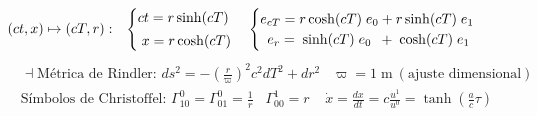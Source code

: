 \begin{align*}
&(ct, x)\mapsto(cT, r):
&\begin{cases} 
ct=r\sinh (cT) \vspace{2pt} \\
\; x=r\cosh(cT) 
\end{cases}
&\begin{cases} 
e_{cT} = r\cosh(cT)\;e_0 + r\sinh(cT)\;e_1\\
\;\:e_r=\; \sinh(cT)\;e_0 \;\:+ \; \cosh(cT) \; e_1
\end{cases}
\end{align*}
\begin{align*}
    &\dashv\text{Métrica de Rindler: } ds^2 = -\left(\frac{r}{\varpi}\right)^2 c^2 dT^2 + dr^2  \;\;\; \varpi= 1 \;\text{m}\: (\text{ajuste dimensional})\\ 
    &\text{Símbolos de Christoffel: } \Gamma^0_{10}=\Gamma^0_{01}= \frac{1}{r}\; \; \; \Gamma^1_{00}  = r\;\; \;\;  \dot{x}= \frac{dx}{dt}=c\frac{u^1}{u^0}=\tanh(\tfrac{a}{c}\tau)\
\end{align*}
